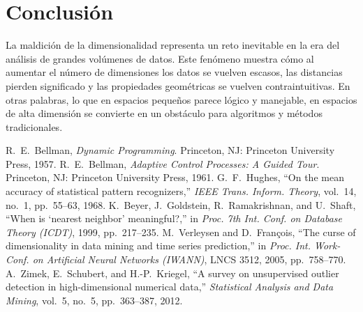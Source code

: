 \documentclass[conference,9pt]{IEEEtran}
\begin{document}
\section{Conclusión}
La maldición de la dimensionalidad representa un reto inevitable en la era del análisis de grandes volúmenes de datos. Este fenómeno muestra cómo al aumentar el número de dimensiones los datos se vuelven escasos, las distancias pierden significado y las propiedades geométricas se vuelven contraintuitivas. En otras palabras, lo que en espacios pequeños parece lógico y manejable, en espacios de alta dimensión se convierte en un obstáculo para algoritmos y métodos tradicionales.

\begin{thebibliography}{00}
 R.~E.~Bellman, \emph{Dynamic Programming}. Princeton, NJ: Princeton University Press, 1957.
 R.~E.~Bellman, \emph{Adaptive Control Processes: A Guided Tour}. Princeton, NJ: Princeton University Press, 1961.
 G.~F.~Hughes, “On the mean accuracy of statistical pattern recognizers,” \emph{IEEE Trans. Inform. Theory}, vol.~14, no.~1, pp.~55–63, 1968.
 K.~Beyer, J.~Goldstein, R.~Ramakrishnan, and U.~Shaft, “When is ‘nearest neighbor’ meaningful?,” in \emph{Proc. 7th Int. Conf. on Database Theory (ICDT)}, 1999, pp.~217–235.
 M.~Verleysen and D.~Fran\c{c}ois, “The curse of dimensionality in data mining and time series prediction,” in \emph{Proc. Int. Work-Conf. on Artificial Neural Networks (IWANN)}, LNCS 3512, 2005, pp.~758–770.
 A.~Zimek, E.~Schubert, and H.-P.~Kriegel, “A survey on unsupervised outlier detection in high-dimensional numerical data,” \emph{Statistical Analysis and Data Mining}, vol.~5, no.~5, pp.~363–387, 2012.
\end{thebibliography}
\end{document}
